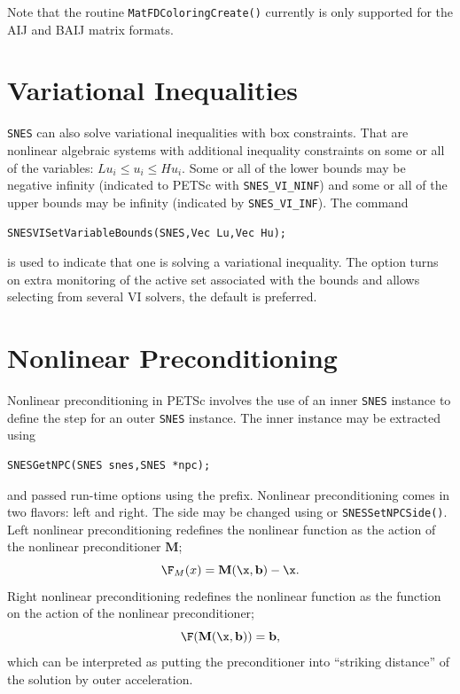Note that the routine \lstinline{MatFDColoringCreate()} currently is only supported for the AIJ and BAIJ matrix formats.

\section{Variational Inequalities}
\label{sec_vi}

\lstinline{SNES} can also solve variational inequalities with box constraints. 
That are nonlinear algebraic systems with additional inequality constraints on some or all of the variables: $ Lu_i \le u_i \le Hu_i $.
Some or all of the lower bounds may be negative infinity (indicated to PETSc with \lstinline{SNES_VI_NINF}) and some or all of the upper bounds may be infinity (indicated by \lstinline{SNES_VI_INF}). The command
\begin{lstlisting}
SNESVISetVariableBounds(SNES,Vec Lu,Vec Hu);
\end{lstlisting}
is  used to indicate that one is solving a variational inequality. The option   turns on extra monitoring of the active set associated with the bounds and   allows selecting from several VI solvers, the default is preferred.

\section{Nonlinear Preconditioning}

Nonlinear preconditioning in PETSc involves the use of an inner \lstinline{SNES} instance to define the step for an outer \lstinline{SNES}
instance.  The inner instance may be extracted using
\begin{lstlisting}
SNESGetNPC(SNES snes,SNES *npc);
\end{lstlisting}
and passed run-time options using the 
prefix. Nonlinear preconditioning comes in two flavors: left and right.  The side may be changed
using  or \lstinline{SNESSetNPCSide()}. Left nonlinear preconditioning redefines the nonlinear function as the action of the
nonlinear preconditioner $\mathbf{M}$;
\begin{equation}
        \F_{M}(x) = \mathbf{M}(\x,\mathbf{b}) - \x.
\end{equation}
\noindent Right nonlinear preconditioning redefines the nonlinear function as the function on the action of the
nonlinear preconditioner;
\begin{equation}
        \F(\mathbf{M}(\x,\mathbf{b})) = \mathbf{b},
\end{equation}
\noindent  which can be interpreted as putting the preconditioner into ``striking distance'' of the solution by outer acceleration.

